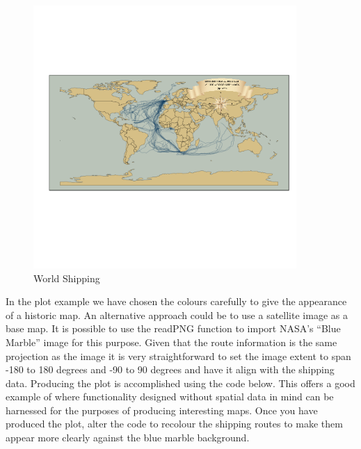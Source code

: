 \documentclass[]{article}
\let\Oldincludegraphics\includegraphics
\renewcommand{\includegraphics}[1]{\Oldincludegraphics[width=10cm]{#1}}
\begin{document}
\begin{figure}[htbp]
\centering
\includegraphics{figure/World_Shipping.png}
\caption{World Shipping}
\end{figure}

In the plot example we have chosen the colours carefully to give the
appearance of a historic map. An alternative approach could be to use a
satellite image as a base map. It is possible to use the readPNG
function to import NASA's ``Blue Marble'' image for this purpose. Given
that the route information is the same projection as the image it is
very straightforward to set the image extent to span -180 to 180 degrees
and -90 to 90 degrees and have it align with the shipping data.
Producing the plot is accomplished using the code below. This offers a
good example of where functionality designed without spatial data in
mind can be harnessed for the purposes of producing interesting maps.
Once you have produced the plot, alter the code to recolour the shipping
routes to make them appear more clearly against the blue marble
background.
\end{document}
